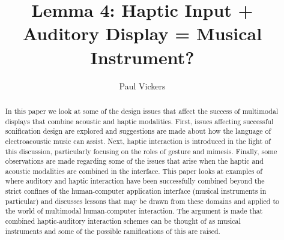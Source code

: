 \documentclass[runningheads]{llncs}
\begin{document}
\pagestyle{headings}


\mainmatter

\title{Lemma 4:  Haptic Input + Auditory Display = Musical Instrument?}


\author{Paul Vickers}



\maketitle

\begin{abstract}
In this paper we look at some of the design issues that affect the success of multimodal displays that combine acoustic and haptic modalities. First, issues affecting successful sonification design are explored and suggestions are made about how the language of electroacoustic music can assist. Next, haptic interaction is introduced in the light of this discussion, particularly focusing on the roles of gesture and mimesis. Finally, some observations are made regarding some of the issues that arise when the haptic and acoustic modalities are combined in the interface. This paper looks at examples of where auditory and haptic interaction have been successfully combined beyond the strict confines of the human-computer application interface (musical instruments in particular) and discusses lessons that may be drawn from these domains and applied to the world of multimodal human-computer interaction. The argument is made that combined haptic-auditory interaction schemes can be thought of as musical instruments and some of the possible ramifications of this are raised.  
\end{abstract}
\end{document}
